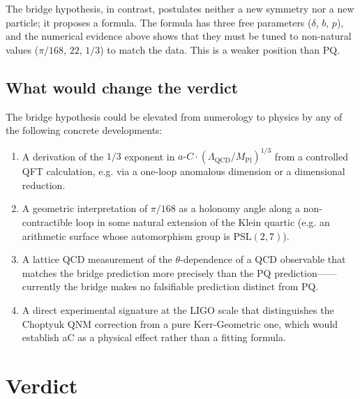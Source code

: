 \documentclass[11pt,a4paper]{article}
\newcommand{\aC}{a\text{-}C}
\newcommand{\LamQ}{\Lambda_{\mathrm{QCD}}}
\newcommand{\MP}{M_{\mathrm{Pl}}}
\newcommand{\PSL}{\mathrm{PSL}}
\theoremstyle{plain}
\theoremstyle{definition}
\theoremstyle{remark}
\begin{document}
The bridge hypothesis, in contrast, postulates neither a new symmetry
nor a new particle; it proposes a formula.  The formula has three free
parameters ($\delta$, $b$, $p$), and the numerical evidence above
shows that they must be tuned to non-natural values ($\pi/168$, $22$,
$1/3$) to match the data.  This is a weaker position than PQ.

\subsection{What would change the verdict}\label{ssec:disc-tests}

The bridge hypothesis could be elevated from numerology to physics by
any of the following concrete developments:
\begin{enumerate}[leftmargin=2em,itemsep=0.2em]
  \item A derivation of the $1/3$ exponent in
        $\aC\cdot(\LamQ/\MP)^{1/3}$ from a controlled QFT calculation,
        e.g. via a one-loop anomalous dimension or a dimensional
        reduction.
  \item A geometric interpretation of $\pi/168$ as a holonomy angle
        along a non-contractible loop in some natural extension of the
        Klein quartic (e.g. an arithmetic surface whose automorphism
        group is $\PSL(2,7)$).
  \item A lattice QCD measurement of the $\theta$-dependence of a QCD
        observable that matches the bridge prediction more precisely
        than the PQ prediction——currently the bridge makes no
        falsifiable prediction distinct from PQ.
  \item A direct experimental signature at the LIGO scale that
        distinguishes the Choptyuk QNM correction from a pure
        Kerr-Geometric one, which would establish \aC{} as a physical
        effect rather than a fitting formula.
\end{enumerate}

\section{Verdict}\label{sec:verdict}
\end{document}
